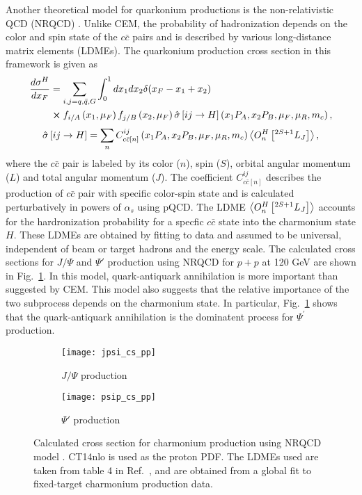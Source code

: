 \documentclass[../main.tex]{subfiles}
\begin{document}
Another theoretical model for quarkonium productions is the non-relativistic 
QCD (NRQCD) \cite{bodwin1995,bodwin1997}. Unlike CEM, the probability of 
hadronization depends on the color and spin state of the $c\bar{c}$ pairs and 
is described by various long-distance matrix elements (LDMEs). The quarkonium 
production cross section in this framework is given as
\begin{equation}
    \begin{split}
        \frac{d\sigma^H}{dx_F} &=\sum_{i,j = q,\bar{q},G}\int^1_0 dx_1 dx_2 \delta(x_F-x_1+x_2)\\
        &\cross f_{i/A}\left(x_1,\mu_F\right)f_{j/B}\left(x_2,\mu_F\right)\hat{\sigma}\left[ij\rightarrow H\right]\left(x_1P_A,x_2P_B,\mu_F,\mu_R , m_c\right),
    \end{split}
\end{equation}
\begin{equation}
    \hat{\sigma}\left[ij\rightarrow H\right]= \sum_n C^{ij}_{c\bar{c}\left[n\right]}\left(x_1P_A,x_2P_B,\mu_F,\mu_R , m_c\right)\expval{O^H_n \left[^{2S+1}L_J\right]},
\end{equation}
where the $c\bar{c}$ pair is labeled by its color ($n$), spin ($S$), orbital 
angular momentum ($L$) and total angular momentum ($J$). The coefficient 
$C^{ij}_{c\bar{c}\left[n\right]}$ describes the production of $c\bar{c}$ pair 
with specific color-spin state and is calculated perturbatively in powers of 
$\alpha_s$ using pQCD. The LDME $\expval{O^H_n \left[^{2S+1}L_J\right]}$ accounts 
for the hardronization probability for a specfic $c\bar{c}$ state into the 
charmonium state $H$. These LDMEs are obtained by fitting to data and assumed to
be universal, independent of beam or target hadrons and the energy scale. The 
calculated cross sections for $J/\Psi$ and $\Psi'$ production using NRQCD for 
$p+p$ at 120 GeV are shown in Fig.\ \ref{fig:NRQCD_cs}. In this model, quark-antiquark
annihilation is more important than suggested by CEM. This model also suggests 
that the relative importance of the two subprocess depends on the charmonium state. 
In particular, Fig.\ \ref{fig:NRQCD_cs} shows that the quark-antiquark annihilation 
is the dominatent process for $\Psi^\prime$ production.
\begin{figure}[h!]
    \centering
    \begin{subfigure}{0.45\linewidth}
    \texttt{[image: jpsi\_cs\_pp]}
    \caption{$J/\Psi$ production}
    \end{subfigure}
    \quad
    \begin{subfigure}{0.45\linewidth}
    \texttt{[image: psip\_cs\_pp]}
    \caption{$\Psi'$ production}
    \end{subfigure}
    \caption{Calculated cross section for charmonium production using NRQCD model
		\cite{chang2021}. CT14nlo is used as the proton PDF. The LDMEs used are
		taken from table \num{4} in Ref.\ \cite{hsieh2021}, and are obtained from a 
		global fit to fixed-target charmonium production data. }
    \label{fig:NRQCD_cs}
\end{figure}


\ifSubfilesClassLoaded{ \printbibliography[heading=bibintoc,title={References}]}{}
\end{document}
